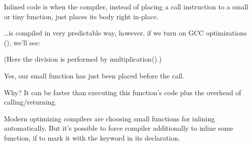 \label{inline_code}

Inlined code is when the compiler, instead of placing a call instruction to a small or tiny function,
just places its body right in-place.



\dots is compiled in very predictable way, however, if we turn on GCC optimizations (\Othree), we'll see:



(Here the division is performed by multiplication().)

Yes, our small function  has just been placed before the \printf call.

Why? It can be faster than executing this function's code plus the overhead of calling/returning.

Modern optimizing compilers are choosing small functions for inlining automatically.
But it's possible to force compiler additionally to inline some function, if to mark
it with the  keyword in its declaration.


